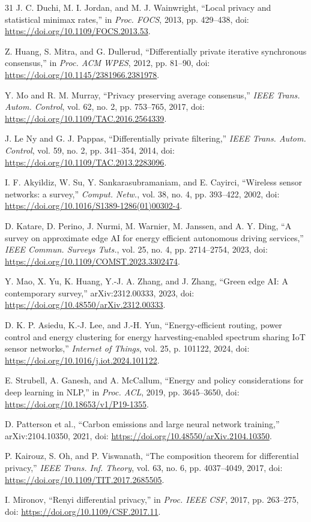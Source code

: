\documentclass[10pt]{article}
\begin{document}
\begin{thebibliography}{31}
J. C. Duchi, M. I. Jordan, and M. J. Wainwright, ``Local privacy and statistical minimax rates,'' in \emph{Proc. FOCS}, 2013, pp. 429--438, doi: \url{https://doi.org/10.1109/FOCS.2013.53}.

Z. Huang, S. Mitra, and G. Dullerud, ``Differentially private iterative synchronous consensus,'' in \emph{Proc. ACM WPES}, 2012, pp. 81--90, doi: \url{https://doi.org/10.1145/2381966.2381978}.

Y. Mo and R. M. Murray, ``Privacy preserving average consensus,'' \emph{IEEE Trans. Autom. Control}, vol. 62, no. 2, pp. 753--765, 2017, doi: \url{https://doi.org/10.1109/TAC.2016.2564339}.

J. Le Ny and G. J. Pappas, ``Differentially private filtering,'' \emph{IEEE Trans. Autom. Control}, vol. 59, no. 2, pp. 341--354, 2014, doi: \url{https://doi.org/10.1109/TAC.2013.2283096}.

I. F. Akyildiz, W. Su, Y. Sankarasubramaniam, and E. Cayirci, ``Wireless sensor networks: a survey,'' \emph{Comput. Netw.}, vol. 38, no. 4, pp. 393--422, 2002, doi: \url{https://doi.org/10.1016/S1389-1286(01)00302-4}.

D. Katare, D. Perino, J. Nurmi, M. Warnier, M. Janssen, and A. Y. Ding, ``A survey on approximate edge AI for energy efficient autonomous driving services,'' \emph{IEEE Commun. Surveys Tuts.}, vol. 25, no. 4, pp. 2714--2754, 2023, doi: \url{https://doi.org/10.1109/COMST.2023.3302474}.

Y. Mao, X. Yu, K. Huang, Y.-J. A. Zhang, and J. Zhang, ``Green edge AI: A contemporary survey,'' arXiv:2312.00333, 2023, doi: \url{https://doi.org/10.48550/arXiv.2312.00333}.

D. K. P. Asiedu, K.-J. Lee, and J.-H. Yun, ``Energy-efficient routing, power control and energy clustering for energy harvesting-enabled spectrum sharing IoT sensor networks,'' \emph{Internet of Things}, vol. 25, p. 101122, 2024, doi: \url{https://doi.org/10.1016/j.iot.2024.101122}.

E. Strubell, A. Ganesh, and A. McCallum, ``Energy and policy considerations for deep learning in NLP,'' in \emph{Proc. ACL}, 2019, pp. 3645--3650, doi: \url{https://doi.org/10.18653/v1/P19-1355}.

D. Patterson et al., ``Carbon emissions and large neural network training,'' arXiv:2104.10350, 2021, doi: \url{https://doi.org/10.48550/arXiv.2104.10350}.

P. Kairouz, S. Oh, and P. Viswanath, ``The composition theorem for differential privacy,'' \emph{IEEE Trans. Inf. Theory}, vol. 63, no. 6, pp. 4037--4049, 2017, doi: \url{https://doi.org/10.1109/TIT.2017.2685505}.

I. Mironov, ``Renyi differential privacy,'' in \emph{Proc. IEEE CSF}, 2017, pp. 263--275, doi: \url{https://doi.org/10.1109/CSF.2017.11}.

\end{thebibliography}
\end{document}

